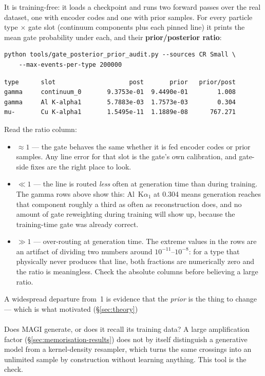 \documentclass[11pt,a4paper]{article}
\begin{document}
It is training-free: it loads a checkpoint and runs two forward passes over the
real dataset, one with encoder codes and one with prior samples. For every
particle type $\times$ gate slot (continuum components plus each pinned line) it
prints the mean gate probability under each, and their \textbf{prior/posterior
ratio}:

\begin{lstlisting}[language=shell]
python tools/gate_posterior_prior_audit.py --sources CR Small \
    --max-events-per-type 200000
\end{lstlisting}

\begin{lstlisting}[language=shell]
type      slot                    post       prior   prior/post
gamma     continuum_0       9.3753e-01  9.4490e-01        1.008
gamma     Al K-alpha1       5.7883e-03  1.7573e-03        0.304
mu-       Cu K-alpha1       1.5495e-11  1.1889e-08      767.271
\end{lstlisting}

Read the ratio column:

\begin{itemize}[nosep]
  \item $\approx 1$ --- the gate behaves the same whether it is fed encoder
    codes or prior samples. Any line error for that slot is the gate's own
    calibration, and gate-side fixes are the right place to look.
  \item $\ll 1$ --- the line is routed \emph{less} often at generation time
    than during training. The gamma rows above show this: Al~K$\alpha_1$ at
    0.304 means generation reaches that component roughly a third as often as
    reconstruction does, and no amount of gate reweighting during training will
    show up, because the training-time gate was already correct.
  \item $\gg 1$ --- over-routing at generation time. The extreme values in the
    \code{mu-} rows are an artifact of dividing two numbers around
    $10^{-11}$--$10^{-8}$: for a type that physically never produces that line,
    both fractions are numerically zero and the ratio is meaningless. Check the
    absolute columns before believing a large ratio.
\end{itemize}

A widespread departure from~1 is evidence that the \emph{prior} is the thing to
change --- which is what motivated \code{prior\_zone\_conditioning}
(\S\ref{sec:theory})

\paragraph{}
\label{sec:memorisation-tool}
Does MAGI generate, or does it recall its training data? A large amplification
factor (\S\ref{sec:memorisation-results}) does not by itself distinguish a
generative model from a kernel-density resampler, which turns the same
crossings into an unlimited sample by construction without learning anything.
This tool is the check.
\end{document}
